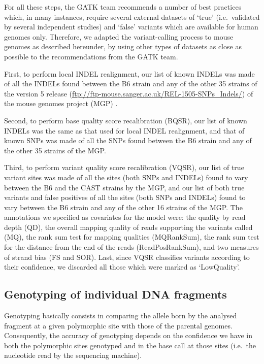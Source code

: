 For all these steps, the GATK team recommends a number of best practices \citep{depristo2011framework, vanderauwera2013fastq} which, in many instances, require several external datasets of ‘true’ (i.e.\ validated by several independent studies) and ‘false’ variants which are available for human genomes only.
Therefore, we adapted the variant-calling process to mouse genomes as described hereunder, by using other types of datasets as close as possible to the recommendations from the GATK team. 

First, to perform local INDEL realignment, our list of known INDELs was made of all the INDELs found between the B6 strain and any of the other 35 strains of the version 5 release (\url{ftp://ftp-mouse.sanger.ac.uk/REL-1505-SNPs_Indels/}) of the mouse genomes project (MGP) \citep{keane2011mouse}.

Second, to perform base quality score recalibration (BQSR), our list of known INDELs was the same as that used for local INDEL realignment, and that of known SNPs was made of all the SNPs found between the B6 strain and any of the other 35 strains of the MGP\@.

Third, to perform variant quality score recalibration (VQSR), our list of true variant sites was made of all the sites (both SNPs and INDELs) found to vary between the B6 and the CAST strains by the MGP, and our list of both true variants and false positives of all the sites (both SNPs and INDELs) found to vary between the B6 strain and any of the other 16 strains of the MGP\@. 
The annotations we specified as covariates for the model were: the quality by read depth (QD), the overall mapping quality of reads supporting the variants called (MQ), the rank sum test for mapping qualities (MQRankSum), the rank sum test for the distance from the end of the reads (ReadPosRankSum), and two measures of strand bias (FS and SOR).
Last, since VQSR classifies variants according to their confidence, we discarded all those which were marked as ‘LowQuality’.




\subsection{Genotyping of individual DNA fragments}

Genotyping basically consists in comparing the allele born by the analysed fragment at a given polymorphic site with those of the parental genomes.
Consequently, the accuracy of genotyping depends on the confidence we have in both the polymorphic sites genotyped and in the base call at those sites (i.e.\ the nucleotide read by the sequencing machine).


